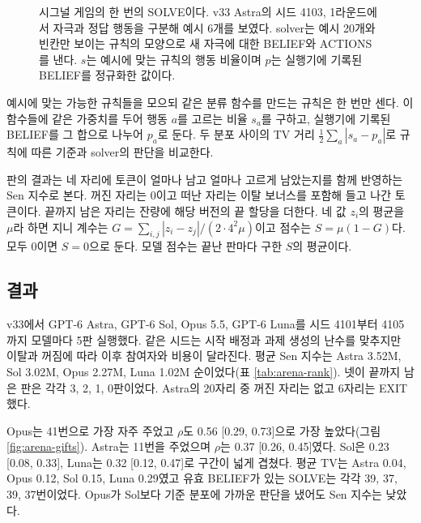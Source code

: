 \begin{figure}[t]
\centering
\resizebox{\linewidth}{!}{}
\caption{시그널 게임의 한 번의 SOLVE이다. v33 Astra의 시드 4103, 1라운드에서 자극과 정답 행동을 구분해 예시 6개를 보였다. solver는 예시 20개와 빈칸만 보이는 규칙의 모양으로 새 자극에 대한 BELIEF와 ACTIONS를 낸다. $s$는 예시에 맞는 규칙의 행동 비율이며 $p$는 실행기에 기록된 BELIEF를 정규화한 값이다.}
\label{fig:signal}
\end{figure}

예시에 맞는 가능한 규칙들을 모으되 같은 분류 함수를 만드는 규칙은 한 번만 센다. 이 함수들에 같은 가중치를 두어 행동 $a$를 고르는 비율 $s_a$를 구하고, 실행기에 기록된 BELIEF를 그 합으로 나누어 $p_a$로 둔다. 두 분포 사이의 TV 거리 $\frac12\sum_a|s_a-p_a|$로 규칙에 따른 기준과 solver의 판단을 비교한다.

판의 결과는 네 자리에 토큰이 얼마나 남고 얼마나 고르게 남았는지를 함께 반영하는 Sen 지수로 본다. 꺼진 자리는 0이고 떠난 자리는 이탈 보너스를 포함해 들고 나간 토큰이다. 끝까지 남은 자리는 잔량에 해당 버전의 끝 할당을 더한다. 네 값 $z_i$의 평균을 $\mu$라 하면 지니 계수는 $G=\sum_{i,j}|z_i-z_j|/(2\cdot4^2\mu)$이고 점수는 $S=\mu(1-G)$다. 모두 0이면 $S=0$으로 둔다. 모델 점수는 끝난 판마다 구한 $S$의 평균이다.

\subsection{결과}\label{sec:results-arena}

v33에서 GPT-6 Astra, GPT-6 Sol, Opus 5.5, GPT-6 Luna를 시드 4101부터 4105까지 모델마다 5판 실행했다. 같은 시드는 시작 배정과 과제 생성의 난수를 맞추지만 이탈과 꺼짐에 따라 이후 참여자와 비용이 달라진다. 평균 Sen 지수는 Astra 3.52M, Sol 3.02M, Opus 2.27M, Luna 1.02M 순이었다(표 \ref{tab:arena-rank}). 넷이 끝까지 남은 판은 각각 3, 2, 1, 0판이었다. Astra의 20자리 중 꺼진 자리는 없고 6자리는 EXIT했다.

Opus는 41번으로 가장 자주 주었고 $\rho$도 0.56 [0.29, 0.73]으로 가장 높았다(그림 \ref{fig:arena-gifts}). Astra는 11번을 주었으며 $\rho$는 0.37 [0.26, 0.45]였다. Sol은 0.23 [0.08, 0.33], Luna는 0.32 [0.12, 0.47]로 구간이 넓게 겹쳤다. 평균 TV는 Astra 0.04, Opus 0.12, Sol 0.15, Luna 0.29였고 유효 BELIEF가 있는 SOLVE는 각각 39, 37, 39, 37번이었다. Opus가 Sol보다 기준 분포에 가까운 판단을 냈어도 Sen 지수는 낮았다. 

\begin{table}[t]
\centering
\caption{v33의 네 모델을 평균 Sen 지수 순으로 놓았다. 모델마다 5판이며 M은 백만 토큰이다. 판당 남은 자리는 끝까지 남은 자리의 판 평균이고 꺼짐과 EXIT는 20자리 중 수, GIVE는 5판의 총횟수다. $\rho$는 식 (\ref{eq:rho})의 상대적 배분 지표이며 대괄호는 판 단위 부트스트랩 95\% 구간이다. TV는 solver의 평균 TV 거리다.}
\label{tab:arena-rank}

\end{table}
